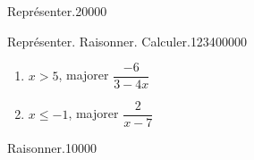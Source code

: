 \begin{pageParcourst}
\begin{ExoCtN}{Représenter.}{2}{0}{0}{0}{0}
\end{ExoCtN} 


 \begin{ExoCt}{Représenter. Raisonner. Calculer.}{1234}{0}{0}{0}{0}{0}

\begin{enumerate}
\item $x > 5 $, majorer $\dfrac{-6}{3-4x}$ 
\item $x \leq -1$, majorer $\dfrac{2}{x-7}$
\end{enumerate}

\end{ExoCt}
 
\end{pageParcourst}
%




\begin{pageAuto} 

 
\begin{ExoAutoN}{Raisonner.}{1}{0}{0}{0}{0}


\end{ExoAutoN}









\end{pageAuto}
